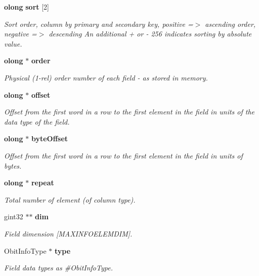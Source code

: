\begin{CompactItemize}
{\bf olong} {\bf sort} [2]
\begin{CompactList}\small\item\em Sort order, column by primary and secondary key, positive =$>$ ascending order, negative =$>$ descending An additional + or - 256 indicates sorting by absolute value. \item\end{CompactList}\item 
{\bf olong} $\ast$ {\bf order}
\begin{CompactList}\small\item\em Physical (1-rel) order number of each field - as stored in memory. \item\end{CompactList}\item 
{\bf olong} $\ast$ {\bf offset}
\begin{CompactList}\small\item\em Offset from the first word in a row to the first element in the field in units of the data type of the field. \item\end{CompactList}\item 
{\bf olong} $\ast$ {\bf byte\-Offset}
\begin{CompactList}\small\item\em Offset from the first word in a row to the first element in the field in units of bytes. \item\end{CompactList}\item 
{\bf olong} $\ast$ {\bf repeat}
\begin{CompactList}\small\item\em Total number of element (of column type). \item\end{CompactList}\item 
gint32 $\ast$$\ast$ {\bf dim}
\begin{CompactList}\small\item\em Field dimension [MAXINFOELEMDIM]. \item\end{CompactList}\item 
Obit\-Info\-Type $\ast$ {\bf type}
\begin{CompactList}\small\item\em Field data types as \#Obit\-Info\-Type. \item\end{CompactList}\item 
$$
\end{CompactItemize}
